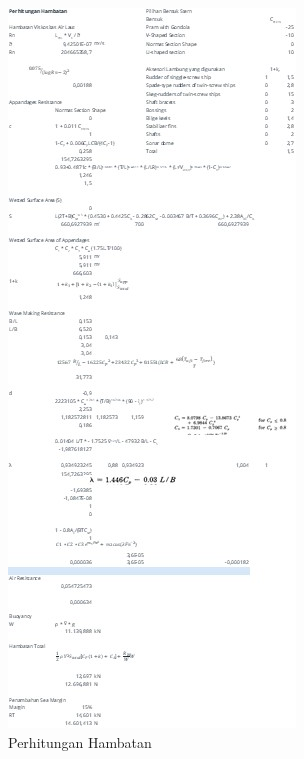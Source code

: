 \begin{figure}[!ht]
    \centering
    \includegraphics[width=0.95\linewidth,height=0.95\textheight,keepaspectratio]{lampiran/deskap-2.jpg}
    \caption*{Perhitungan Hambatan}
\end{figure}

